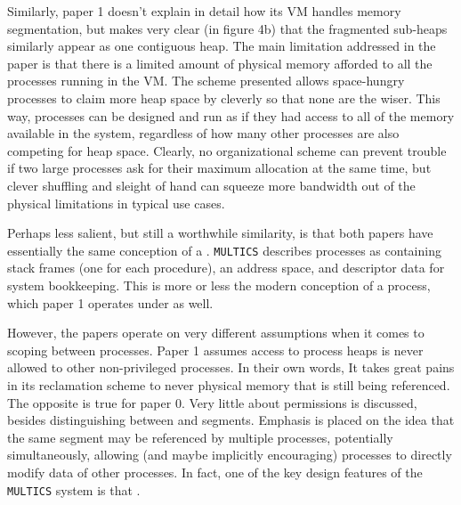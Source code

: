 \documentclass{article}
\begin{document}
Similarly, paper 1 doesn't explain in detail how its VM handles memory segmentation, but makes very clear (in figure 4b) that the fragmented sub-heaps similarly appear as one contiguous heap. The main limitation addressed in the paper is that there is a limited amount of physical memory afforded to all the processes running in the VM. The scheme presented allows space-hungry processes to claim more heap space by cleverly  so that none are the wiser. This way, processes can be designed and run as if they had access to all of the memory available in the system, regardless of how many other processes are also competing for heap space. Clearly, no organizational scheme can prevent trouble if two large processes ask for their maximum allocation at the same time, but clever shuffling and sleight of hand can squeeze more bandwidth out of the physical limitations in typical use cases.

Perhaps less salient, but still a worthwhile similarity, is that both papers have essentially the same conception of a . \verb|MULTICS| describes processes as containing stack frames (one for each procedure), an address space, and descriptor data for system bookkeeping. This is more or less the modern conception of a process, which paper 1 operates under as well.

However, the papers operate on very different assumptions when it comes to scoping between processes. Paper 1 assumes access to process heaps is never allowed to other non-privileged processes. In their own words,  It takes great pains in its reclamation scheme to never  physical memory that is still being referenced. The opposite is true for paper 0. Very little about permissions is discussed, besides distinguishing between  and  segments. Emphasis is placed on the idea that the same segment may be referenced by multiple processes, potentially simultaneously, allowing (and maybe implicitly encouraging) processes to directly modify data of other processes. In fact, one of the key design features of the \verb|MULTICS| system is that .
\end{document}

